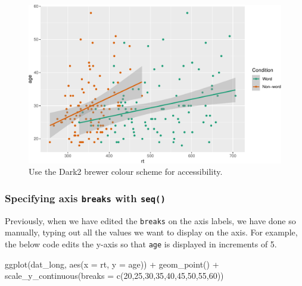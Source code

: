 \documentclass[
  english,
  doc,floatsintext]{apa6}
\newenvironment{Shaded}{\begin{snugshade}}{\end{snugshade}}
\newcommand{\AttributeTok}[1]{\textcolor[rgb]{0.77,0.63,0.00}{#1}}
\newcommand{\DecValTok}[1]{\textcolor[rgb]{0.00,0.00,0.81}{#1}}
\newcommand{\FunctionTok}[1]{\textcolor[rgb]{0.00,0.00,0.00}{#1}}
\newcommand{\NormalTok}[1]{#1}
\newcommand{\SpecialCharTok}[1]{\textcolor[rgb]{0.00,0.00,0.00}{#1}}
\begin{document}
\begin{figure}

{\centering \includegraphics[width=1\linewidth]{images/brewer-1} 

}

\caption{Use the Dark2 brewer colour scheme for accessibility.}\label{fig:brewer}
\end{figure}

\hypertarget{specifying-axis-breaks-with-seq}{%
\subsubsection{\texorpdfstring{Specifying axis \texttt{breaks} with \texttt{seq()}}{Specifying axis breaks with seq()}}\label{specifying-axis-breaks-with-seq}}

Previously, when we have edited the \texttt{breaks} on the axis labels, we have done so manually, typing out all the values we want to display on the axis. For example, the below code edits the y-axis so that \texttt{age} is displayed in increments of 5.

\begin{Shaded}
\begin{Highlighting}[]
\FunctionTok{ggplot}\NormalTok{(dat\_long, }\FunctionTok{aes}\NormalTok{(}\AttributeTok{x =}\NormalTok{ rt, }\AttributeTok{y =}\NormalTok{ age)) }\SpecialCharTok{+}
  \FunctionTok{geom\_point}\NormalTok{() }\SpecialCharTok{+}
  \FunctionTok{scale\_y\_continuous}\NormalTok{(}\AttributeTok{breaks =} \FunctionTok{c}\NormalTok{(}\DecValTok{20}\NormalTok{,}\DecValTok{25}\NormalTok{,}\DecValTok{30}\NormalTok{,}\DecValTok{35}\NormalTok{,}\DecValTok{40}\NormalTok{,}\DecValTok{45}\NormalTok{,}\DecValTok{50}\NormalTok{,}\DecValTok{55}\NormalTok{,}\DecValTok{60}\NormalTok{))}
\end{Highlighting}
\end{Shaded}
\end{document}

